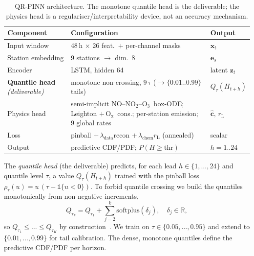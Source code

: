 \documentclass[conference]{IEEEtran}
\newcommand{\othree}{\ensuremath{\mathrm{O_3}}}
\newcommand{\notwo}{\ensuremath{\mathrm{NO_2}}}
\newcommand{\ox}{\ensuremath{\mathrm{O_x}}}
\begin{document}
\begin{table}[t]
\caption{QR-PINN architecture. The monotone quantile head is the deliverable; the physics head is a
regulariser/interpretability device, not an accuracy mechanism.}
\label{tab:arch}
\centering\footnotesize
\renewcommand{\arraystretch}{1.12}
\begin{tabular}{@{}p{}p{}p{}@{}}
\toprule
\textbf{Component} & \textbf{Configuration} & \textbf{Output}\\
\midrule
Input window & 48\,h $\times$ 26 feat.\ $+$ per-channel masks & $\mathbf{x}_t$\\
Station embedding & 9 stations $\rightarrow$ dim.\ 8 & $\mathbf{e}_s$\\
Encoder & LSTM, hidden 64 & latent $\mathbf{z}_t$\\
\textbf{Quantile head} \emph{(deliverable)} & monotone non-crossing, 9\,$\tau$ ($\!\rightarrow\!\{0.01..0.99\}$ tails) & $Q_\tau(H_{t+h})$\\
Physics head & semi-implicit NO--\notwo--\othree\ box-ODE; Leighton $+\,$\ox\ cons.; per-station emission; 9 global rates & $\hat{\mathbf{c}},\,r_{\mathrm{L}}$\\
Loss & pinball $+\,\lambda_{\mathrm{data}}$recon $+\,\lambda_{\mathrm{chem}}r_{\mathrm{L}}$ (annealed) & scalar\\
Output & predictive CDF/PDF; $P(H\!\ge\!\mathrm{thr})$ & $h\!=\!1..24$\\
\bottomrule
\end{tabular}
\end{table}
The \emph{quantile head} (the deliverable) predicts, for each lead $h\!\in\!\{1,\dots,24\}$
and quantile level $\tau$, a value $Q_\tau(H_{t+h})$ trained with the pinball loss
$\rho_\tau(u)=u\,(\tau-\mathbb{1}\{u<0\})$. To forbid quantile crossing we build the
quantiles monotonically from non-negative increments,
\begin{equation}
Q_{\tau_k}=Q_{\tau_1}+\sum_{j=2}^{k}\mathrm{softplus}(\delta_j),\quad \delta_j\in\mathbb{R},
\label{eq:noncross}
\end{equation}
so $Q_{\tau_1}\!\le\!\dots\!\le\!Q_{\tau_K}$ by construction~\cite{cannon2018}.
We train on $\tau\in\{0.05,\dots,0.95\}$ and extend to $\{0.01,\dots,0.99\}$ for tail
calibration. The dense, monotone quantiles define the predictive CDF/PDF per horizon.
\end{document}
